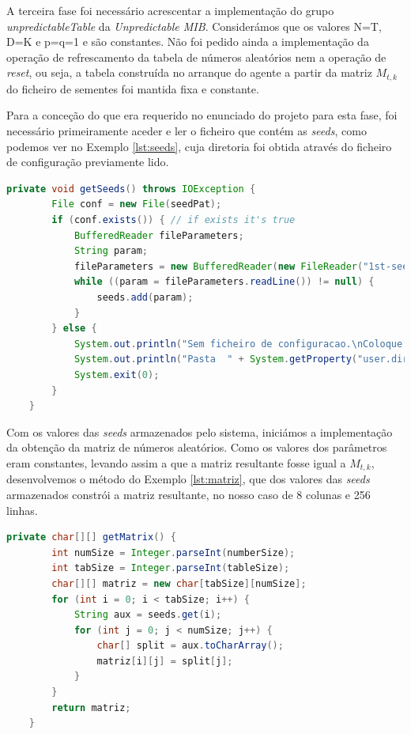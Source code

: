 \documentclass[../momento_1.tex]{subfiles}
\begin{document}
A terceira fase foi necessário acrescentar a implementação do grupo \textit{unpredictableTable} da \textit{Unpredictable MIB}. Considerámos que  os valores N=T, D=K e p=q=1 e são constantes. Não foi pedido ainda a implementação da operação de refrescamento da tabela de números aleatórios nem a operação de \textit{reset}, ou seja, a tabela construída no arranque do agente a partir da matriz $M_{t,k}$ do ficheiro de sementes foi mantida fixa e constante.\par 

Para a conceção do que era requerido no enunciado do projeto para esta fase, foi necessário primeiramente aceder e ler o ficheiro que contém as \textit{seeds}, como podemos ver no Exemplo  \ref{lst:seeds}, cuja diretoria foi obtida através do ficheiro de configuração previamente lido.\\ 

{
\begin{lstlisting}[caption={Método utilizado para obtenção das \textit{seeds}.},label={lst:seeds},language=JAVA]
	private void getSeeds() throws IOException {
        File conf = new File(seedPat);
        if (conf.exists()) { // if exists it's true
            BufferedReader fileParameters;
            String param;
            fileParameters = new BufferedReader(new FileReader("1st-seed"));
            while ((param = fileParameters.readLine()) != null) {
                seeds.add(param);
            }
        } else {
            System.out.println("Sem ficheiro de configuracao.\nColoque na pasta respectiva!");
            System.out.println("Pasta  " + System.getProperty("user.dir"));
            System.exit(0);
        }
    }
\end{lstlisting}}

Com os valores das \textit{seeds} armazenados pelo sistema, iniciámos a implementação da obtenção da matriz de números aleatórios. Como os valores dos parâmetros eram constantes, levando assim a que a matriz resultante fosse igual a $M_{t,k}$, desenvolvemos o método do Exemplo \ref{lst:matriz}, que dos valores das \textit{seeds} armazenados constrói a matriz resultante, no nosso caso de 8 colunas e 256 linhas.\\[1cm]

{
\begin{lstlisting}[caption={Método utilizado para obtenção da matriz de números aleatórios.},label={lst:matriz},language=JAVA]
	private char[][] getMatrix() {
        int numSize = Integer.parseInt(numberSize);
        int tabSize = Integer.parseInt(tableSize);
        char[][] matriz = new char[tabSize][numSize];
        for (int i = 0; i < tabSize; i++) {
            String aux = seeds.get(i);
            for (int j = 0; j < numSize; j++) {
                char[] split = aux.toCharArray();
                matriz[i][j] = split[j];
            }
        }
        return matriz;
    }
\end{lstlisting}}
\end{document}
